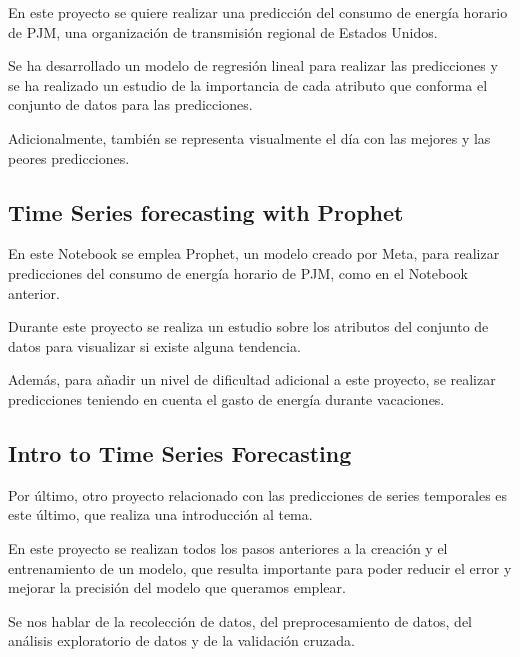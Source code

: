 En este proyecto se quiere realizar una predicción del consumo de energía horario de PJM, una organización de transmisión regional de Estados Unidos.

\par

Se ha desarrollado un modelo de regresión lineal para realizar las predicciones y se ha realizado un estudio de la importancia de cada atributo que conforma el conjunto de datos para las predicciones.

\par

Adicionalmente, también se representa visualmente el día con las mejores y las peores predicciones.

\subsection{Time Series forecasting with Prophet}

En este Notebook \cite{kaggle:3} se emplea Prophet, un modelo creado por Meta, para realizar predicciones del consumo de energía horario de PJM, como en el Notebook anterior.

\par

Durante este proyecto se realiza un estudio sobre los atributos del conjunto de datos para visualizar si existe alguna tendencia.

\par

Además, para añadir un nivel de dificultad adicional a este proyecto, se realizar predicciones teniendo en cuenta el gasto de energía durante vacaciones.

\subsection{Intro to Time Series Forecasting}

Por último, otro proyecto \cite{kaggle:4} relacionado con las predicciones de series temporales es este último, que realiza una introducción al tema.

\par

En este proyecto se realizan todos los pasos anteriores a la creación y el entrenamiento de un modelo, que resulta importante para poder reducir el error y mejorar la precisión del modelo que queramos emplear.

\par

Se nos hablar de la recolección de datos, del preprocesamiento de datos, del análisis exploratorio de datos y de la validación cruzada.